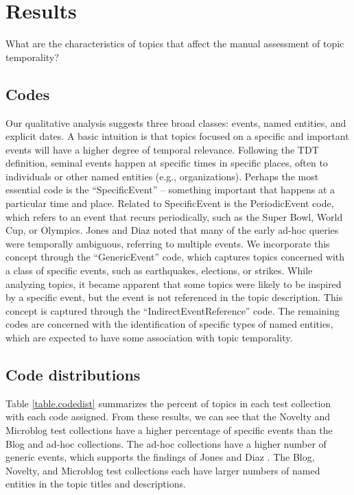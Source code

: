 \documentclass{sig-alternate}
\begin{document}
\section{Results}

What are the characteristics of topics that affect the manual assessment of topic temporality? 

\subsection{Codes}

Our qualitative analysis suggests three broad classes: events, named entities, and explicit dates. A basic intuition is that topics focused on a specific and important events will have a higher degree of temporal relevance. Following the TDT definition, seminal events happen at specific times in specific places, often to individuals or other named entities (e.g., organizations).  Perhaps the most essential code is the ``SpecificEvent'' -- something important that happens at a particular time and place.  Related to SpecificEvent is the PeriodicEvent code, which refers to an event that recurs periodically, such as the Super Bowl, World Cup, or Olympics. Jones and Diaz \cite{Jones2007} noted that many of the early ad-hoc queries were temporally ambiguous, referring to multiple events. We incorporate this concept through the ``GenericEvent'' code, which captures topics concerned with a class of specific events, such as earthquakes, elections, or strikes. While analyzing topics, it became apparent that some topics were likely to be inspired by a specific event, but the event is not referenced in the topic description. This concept is captured through the ``IndirectEventReference'' code.  The remaining codes are concerned with the identification of specific types of named entities, which are expected to have some  association with topic temporality.


\subsection{Code distributions}

Table \ref{table.codedist} summarizes the percent of topics in each test collection with each code assigned. From these results, we can see that the Novelty and Microblog test collections have a higher percentage of specific events than the Blog and ad-hoc collections. The ad-hoc collections have a higher number of generic events, which supports the findings of Jones and Diaz \cite{Jones2007}. The Blog, Novelty, and Microblog test collections each have larger numbers of named entities in the topic titles and descriptions.
\end{document}
